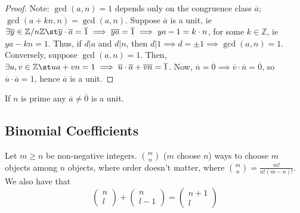 \documentclass[12pt,oneside]{article}
\begin{document}
\begin{proof}
  Note: $\gcd (a,n)= 1$ depends only on the congruence class $\overline{a}$; $\gcd (a+kn, n) = \gcd(a,n)$. Suppose $\overline{a}$ is a unit, ie $\exists \overline{y} \in \mathbb{Z}/n\mathbb{Z} \st \overline{y} \cdot \overline{a} = \overline{1} \implies \overline{ya} = \overline{1} \implies ya - 1 = k \cdot n$, for some $k \in \mathbb{Z}$, ie $ya - kn = 1$. Thus, if $d | a$ and $d|n$, then $d|1 \implies d = \pm 1 \implies \gcd (a,n) = 1$. \\Conversely, suppose $\gcd (a,n) = 1$. Then, $\exists u,v \in \mathbb{Z} \st ua + vn = 1 \implies \overline{u} \cdot \overline{a} + \overline{v} \overline{n} = \overline{1}$. Now, $\overline{n} = \overline{0} \implies \overline{v} \cdot \overline{n} = \overline{0}$, so $\overline{u} \cdot \overline{a}= 1$, hence $\overline{a}$ is a unit.
\end{proof}

\begin{corollary}
  If $n$ is prime any $\overline{a} \neq \overline{0}$ is a unit. 
\end{corollary}



\subsection{Binomial Coefficients}

\begin{definition}
  Let $m \geq n$ be non-negative integers. $m \choose n$ ($m$ choose $n$) ways to choose $m$ objects among $n$ objects, where order doesn't matter, where $m \choose{n}$$= \frac{m!}{n!(m-n)!}$.\\
  We also have that \[\begin{pmatrix}
    n\\
    l
  \end{pmatrix} + \begin{pmatrix}
    n\\
    l-1
  \end{pmatrix} = \begin{pmatrix}
    n+1\\
    l
  \end{pmatrix}\]
\end{definition}
\end{document}
